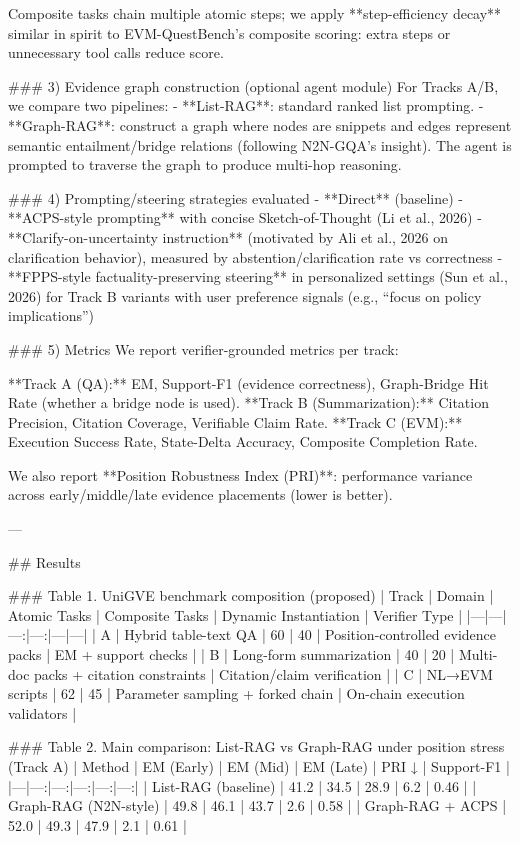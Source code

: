 Composite tasks chain multiple atomic steps; we apply **step-efficiency decay** similar in spirit to EVM-QuestBench’s composite scoring: extra steps or unnecessary tool calls reduce score.

### 3) Evidence graph construction (optional agent module)  
For Tracks A/B, we compare two pipelines:  
- **List-RAG**: standard ranked list prompting.  
- **Graph-RAG**: construct a graph where nodes are snippets and edges represent semantic entailment/bridge relations (following N2N-GQA’s insight). The agent is prompted to traverse the graph to produce multi-hop reasoning.

### 4) Prompting/steering strategies evaluated  
- **Direct** (baseline)  
- **ACPS-style prompting** with concise Sketch-of-Thought (Li et al., 2026)  
- **Clarify-on-uncertainty instruction** (motivated by Ali et al., 2026 on clarification behavior), measured by abstention/clarification rate vs correctness  
- **FPPS-style factuality-preserving steering** in personalized settings (Sun et al., 2026) for Track B variants with user preference signals (e.g., “focus on policy implications”)

### 5) Metrics  
We report verifier-grounded metrics per track:

**Track A (QA):** EM, Support-F1 (evidence correctness), Graph-Bridge Hit Rate (whether a bridge node is used).  
**Track B (Summarization):** Citation Precision, Citation Coverage, Verifiable Claim Rate.  
**Track C (EVM):** Execution Success Rate, State-Delta Accuracy, Composite Completion Rate.

We also report **Position Robustness Index (PRI)**: performance variance across early/middle/late evidence placements (lower is better).

---

## Results  

### Table 1. UniGVE benchmark composition (proposed)
| Track | Domain | Atomic Tasks | Composite Tasks | Dynamic Instantiation | Verifier Type |
|---|---|---:|---:|---|---|
| A | Hybrid table-text QA | 60 | 40 | Position-controlled evidence packs | EM + support checks |
| B | Long-form summarization | 40 | 20 | Multi-doc packs + citation constraints | Citation/claim verification |
| C | NL→EVM scripts | 62 | 45 | Parameter sampling + forked chain | On-chain execution validators |

### Table 2. Main comparison: List-RAG vs Graph-RAG under position stress (Track A)
| Method | EM (Early) | EM (Mid) | EM (Late) | PRI ↓ | Support-F1 |
|---|---:|---:|---:|---:|---:|
| List-RAG (baseline) | 41.2 | 34.5 | 28.9 | 6.2 | 0.46 |
| Graph-RAG (N2N-style) | 49.8 | 46.1 | 43.7 | 2.6 | 0.58 |
| Graph-RAG + ACPS | 52.0 | 49.3 | 47.9 | 2.1 | 0.61 |

